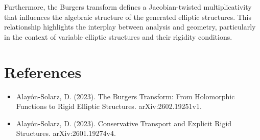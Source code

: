 \documentclass[11pt,a4paper]{article}
\begin{document}
Furthermore, the Burgers transform defines a Jacobian-twisted multiplicativity that influences the algebraic structure of the generated elliptic structures. This relationship highlights the interplay between analysis and geometry, particularly in the context of variable elliptic structures and their rigidity conditions.

\section{References}
\begin{itemize}
    \item Alayón-Solarz, D. (2023). The Burgers Transform: From Holomorphic Functions to Rigid Elliptic Structures. arXiv:2602.19251v1.
    \item Alayón-Solarz, D. (2023). Conservative Transport and Explicit Rigid Structures. arXiv:2601.19274v4.
\end{itemize}
\end{document}
